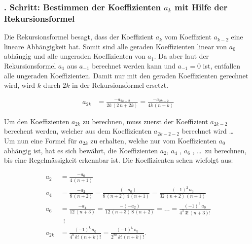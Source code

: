 \subsubsection{. Schritt: Bestimmen der Koeffizienten $a_k$ mit Hilfe der Rekursionsformel }
\begin{normalsize}%
Die Rekursionsformel  besagt,
dass der Koeffizient $a_k$ vom Koeffizient $a_{k-2}$ eine lineare Abh\"angigkeit hat.
Somit sind alle geraden Koeffizienten linear von $a_0$ abh\"angig und alle un\-geraden Koeffizienten von $a_1$.
Da aber laut der Rekursionsformel  $a_1$ aus $a_{-1}$ berechnet werden kann und $a_{-1} = 0$ ist,
entfallen alle ungeraden Koeffizienten.
Damit nur mit den geraden Koeffizienten gerechnet wird,
wird $k$ durch $2k$ in der Rekursionsformel  ersetzt.
\end{normalsize}
\begin{align}
	\nonumber
	a_{2k}
	&=
	\frac
	{
		-a_{2k - 2}
	}{
		2k \, \left( 2 \, n + 2k \right)	
	}
	=
	\frac
	{
		-a_{2k - 2}
	}{
		4k \, \left( n + k \right)	
	} 
\end{align}
\begin{normalsize}%
Um den Koeffizienten $a_{2k}$ zu berechnen,
muss zuerst der Koeffizient $a_{2k-2}$ berechent werden,
welcher aus dem Koeffizienten $a_{2k-2-2}$ berechnet wird \dots \\
Um nun eine Formel f\"ur $a_{2k}$ zu erhalten,
welche nur vom Koeffizienten $a_0$ abh\"angig ist,
hat es sich bew\"ahrt,
die Koeffizienten $a_2$, $a_4$ , $a_6$ , \dots \, zu berechnen,
bis eine Regelm\"assigkeit erkennbar ist.
Die Koeffizienten sehen wiefolgt aus:
\end{normalsize}
\begin{align}
	\nonumber
	a_2
	&=
	\frac
	{
		-a_0
	}{
		4 \, \left( n + 1 \right)	
	}
	\\
	\nonumber
	a_4
	&=
	\frac
	{
		-a_{2}
	}{
		8 \, \left( n + 2 \right)	
	}
	=
	\frac
	{
		- \left( - a_{0} \right)
	}{
		8 \, \left( n + 2 \right) \, 4 \, \left( n + 1 \right)
	}
	=
	\frac
	{
		\left( -1 \right) ^2 \, a_{0}
	}{
		32 \, \left( n + 2 \right) \, \left( n + 1 \right)
	}
	\\
	\nonumber
	a_6
	&=
	\frac
	{
		-a_{4}
	}{
		12 \, \left( n + 3 \right)	
	}
	=
	\frac
	{
		- \left( - a_{2} \right)
	}{
		12 \, \left( n + 3 \right) \, 8 \, \left( n + 2 \right)
	}
	=
	\dots
	=
	\frac
	{
		\left( -1 \right) ^3 \, a_{0}
	}{
		4^3 \, {3}! \, {\left( n + 3 \right)}!
	}
	\\
	\nonumber
	& \, \, \, \vdots
	\\
	a_{2k}
	&=	
	\frac
	{
		\left( -1 \right) ^k \, a_0 
	}{
		4^k \, {k}! \, {\left( n + k \right)}!
	}
	=
	\frac
	{
		\left( -1 \right) ^k \, a_0
	}{
		2^{2k} \, {k}! \, {\left( n + k \right)}!
	}
	\label{eq:bessel:koeffizienten:gerade}
	\text{.}
\end{align}

